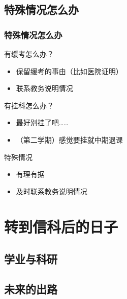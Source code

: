 \documentclass[12pt,AutoFakeBold]{beamer}
\begin{document}
    \subsection{特殊情况怎么办}
    \begin{frame}
        \frametitle{特殊情况怎么办}
        有缓考怎么办？
        \begin{itemize}
            \item 保留缓考的事由（比如医院证明）
            \item 联系教务说明情况
        \end{itemize}
        \pause
        有挂科怎么办？
        \begin{itemize}
            \item 最好别挂了吧……
            \item （第二学期）感觉要挂就中期退课
        \end{itemize}
        \begin{alertblock}{特殊情况}
            \begin{itemize}
                \item 有理有据
                \item 及时联系\alert{教务}说明情况
            \end{itemize}
        \end{alertblock}
    \end{frame}
    \section{转到信科后的日子}
    \subsection{学业与科研}
    \subsection{未来的出路}
    
    
\end{document}
